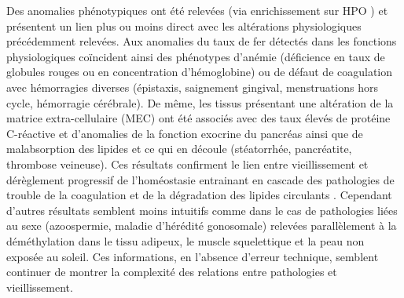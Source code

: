 Des anomalies phénotypiques ont été relevées (via enrichissement sur HPO ) et présentent un lien plus ou moins direct avec les altérations physiologiques précédemment relevées. Aux anomalies du taux de fer détectés dans les fonctions physiologiques coïncident ainsi des phénotypes d'anémie (déficience en taux de globules rouges ou en concentration d'hémoglobine) ou de défaut de coagulation avec hémorragies diverses (épistaxis, saignement gingival, menstruations hors cycle, hémorragie cérébrale). De même, les tissus présentant une altération de la matrice extra-cellulaire (MEC) ont été associés avec des taux élevés de protéine C-réactive et d'anomalies de la fonction exocrine du pancréas ainsi que de malabsorption des lipides et ce qui en découle (stéatorrhée, pancréatite, thrombose veineuse). Ces résultats confirment le lien entre vieillissement et dérèglement progressif de l'homéostasie entrainant en cascade des pathologies de trouble de la coagulation  et de la dégradation des lipides circulants . Cependant d'autres résultats semblent moins intuitifs comme dans le cas de pathologies liées au sexe (azoospermie, maladie d'hérédité gonosomale) relevées parallèlement à la déméthylation dans le tissu adipeux, le muscle squelettique et la peau non exposée au soleil. Ces informations, en l'absence d'erreur technique, semblent continuer de montrer la complexité des relations entre pathologies et vieillissement.

